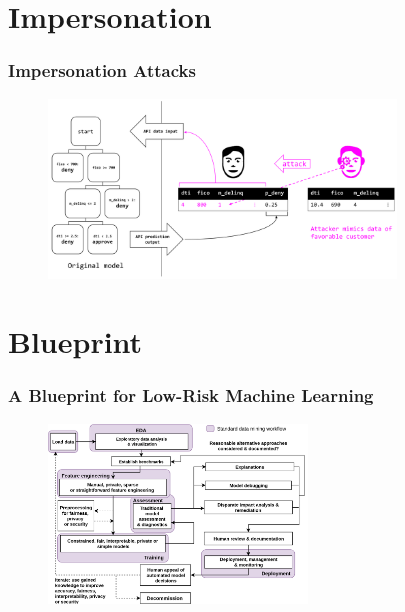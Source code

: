 \documentclass[11pt,
               aspectratio=169,
               hyperref={colorlinks}
               ]{beamer}
\begin{document}
	\section{Impersonation}
	
		\begin{frame}
		
			\frametitle{Impersonation Attacks}		
			
			\begin{figure}[htb]
				\begin{center}
					\includegraphics[height=135pt]{img/imperson.PNG}
				\end{center}
			\end{figure}	

		
		\end{frame}

	\section{Blueprint}
	
		\begin{frame}
		
			\frametitle{A Blueprint for Low-Risk Machine Learning}		
			
			\begin{figure}[htb]
				\begin{center}
					\includegraphics[height=135pt]{img/blueprint.png}
				\end{center}
			\end{figure}	

		
		\end{frame}
\end{document}

